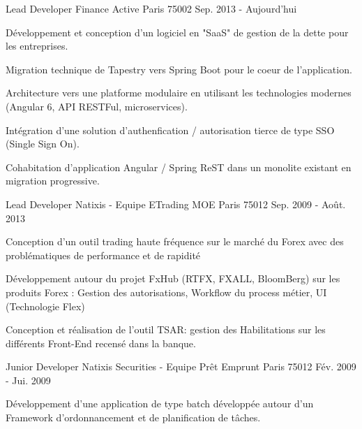 \begin{cventries}
  \cventry
    {Lead Developer}
    {Finance Active}
    {Paris 75002}
    {Sep. 2013 - Aujourd'hui}
    {
      \begin{cvitems}
      	\item {Développement et conception d'un logiciel en "SaaS" de gestion de la dette pour les entreprises.}
        \item {Migration technique de Tapestry vers Spring Boot pour le coeur de l'application.}
         \item {Architecture vers une platforme modulaire en utilisant les technologies modernes (Angular 6, API RESTFul, microservices).}
        \item {Intégration d'une solution d'authenfication / autorisation tierce de type SSO (Single Sign On).}
        \item {Cohabitation d'application Angular / Spring ReST dans un monolite existant en migration progressive.}
      \end{cvitems}
    }
  \cventry
    {Lead Developer}
    {Natixis - Equipe ETrading MOE}
    {Paris 75012}
    {Sep. 2009 - Août. 2013}
    {
      \begin{cvitems}
         \item {Conception d'un outil trading haute fréquence sur le marché du Forex avec des problématiques de performance et de rapidité}
         \item {Développement autour du projet FxHub (RTFX, FXALL, BloomBerg) sur les produits Forex : Gestion des autorisations, Workflow du process métier, UI (Technologie Flex)}
        \item {Conception et réalisation de l'outil TSAR: gestion des Habilitations sur les différents Front-End recensé dans la banque.}
      \end{cvitems}
    }
    
  \cventry
    {Junior Developer}
    {Natixis Securities - Equipe Prêt Emprunt}
    {Paris 75012}
    {Fév. 2009 - Jui. 2009}
    {
      \begin{cvitems}
        \item {Développement d’une application de type batch développée autour d’un Framework d’ordonnancement et de planification de tâches.}
      \end{cvitems} 
    }
\end{cventries}
